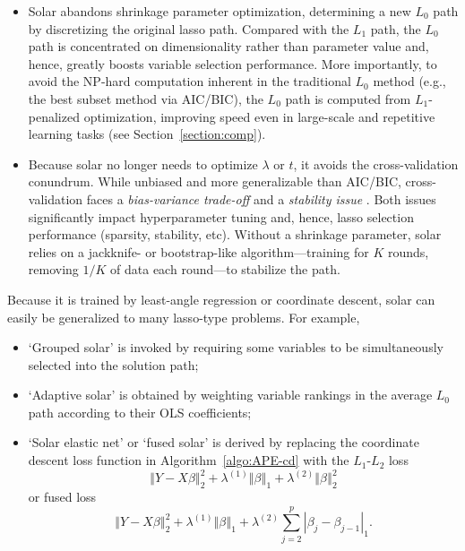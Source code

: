 \documentclass[11pt,review,authoryear]{elsarticle}
\begin{document}
\begin{itemize}

  \item Solar abandons shrinkage parameter optimization, determining a new $L_0$ path by discretizing the original lasso path. Compared with the $L_1$ path, the $L_0$ path is concentrated on dimensionality rather than parameter value and, hence, greatly boosts variable selection performance. More importantly, to avoid the NP-hard computation inherent in the traditional $L_0$ method (e.g., the best subset method via AIC/BIC), the $L_0$ path is computed from $L_1$-penalized optimization, improving speed even in large-scale and repetitive learning tasks (see Section~\ref{section:comp}).

  \item Because solar no longer needs to optimize $\lambda$ or $t$, it avoids the cross-validation conundrum. While unbiased and more generalizable than AIC/BIC, cross-validation faces a \emph{bias-variance trade-off} \citep{kearns1999algorithmic} and a \emph{stability issue} \citep{lim2016estimation}. Both issues significantly impact hyperparameter tuning and, hence, lasso selection performance (sparsity, stability, etc). Without a shrinkage parameter, solar relies on a jackknife- or bootstrap-like algorithm---training for $K$ rounds, removing $1/K$ of data each round---to stabilize the path.

\end{itemize}

Because it is trained by least-angle regression or coordinate descent, solar can easily be generalized to many lasso-type problems. For example,

\begin{itemize}
  \item `Grouped solar' is invoked by requiring some variables to be simultaneously selected into the solution path;
  \item `Adaptive solar' is obtained by weighting variable rankings in the average $L_0$ path according to their OLS coefficients;
  \item `Solar elastic net' or `fused solar' is derived by replacing the coordinate descent loss function in Algorithm~\ref{algo:APE-cd} with the $L_1$-$L_2$ loss
    \begin{equation}
      \left\Vert Y -X\beta \right\Vert_2^2 + \lambda^{(1)} \left\Vert \beta \right\Vert_1 + \lambda^{(2)} \left\Vert \beta \right\Vert_2^2
    \end{equation}
    or fused loss
    \begin{equation}
      \left\Vert Y -X\beta \right\Vert_2^2 + \lambda^{(1)} \left\Vert \beta \right\Vert_1 + \lambda^{(2)} \sum_{j=2}^{p} \left\vert \beta_j - \beta_{j-1} \right\vert_1.
    \end{equation}
\end{itemize}
\end{document}
